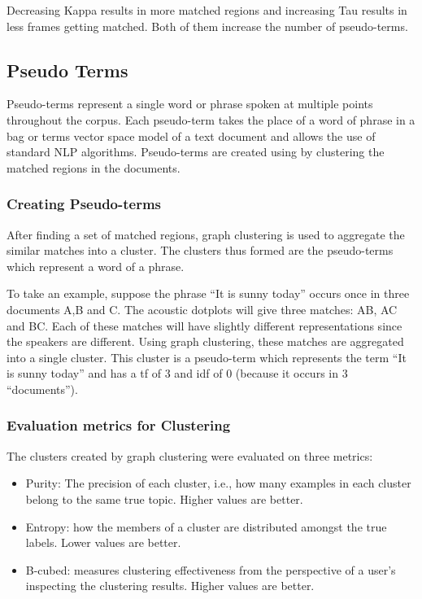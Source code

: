 \documentclass[a4paper]{article}
\begin{document}
Decreasing Kappa results in more matched regions and increasing Tau results in less frames getting matched. Both of them increase the number of pseudo-terms.

\subsection{Pseudo Terms}
Pseudo-terms represent a single word or phrase spoken at multiple points throughout the corpus. Each pseudo-term takes the place of a word of phrase in a bag or terms vector space model of a text document and allows the use of standard NLP algorithms. Pseudo-terms are created using by clustering the matched regions in the documents.

\subsubsection{Creating Pseudo-terms}
After finding a set of matched regions, graph clustering is used to aggregate the similar matches into a cluster.
The clusters thus formed are the pseudo-terms which represent a word of a phrase.

To take an example, suppose the phrase “It is sunny today” occurs once in three documents A,B and C. The acoustic dotplots will give three matches: AB, AC and BC. Each of these matches will have slightly different representations since the speakers are different. Using graph clustering, these matches are aggregated into a single cluster. This cluster is a pseudo-term which represents the term “It is sunny today” and has a tf of 3 and idf of 0 (because it occurs in 3 “documents”).

\subsubsection{Evaluation metrics for Clustering}
The clusters created by graph clustering were evaluated on three metrics:

\begin{itemize}
\item Purity: The precision of each cluster, i.e., how many examples in each cluster belong to the same true topic.
Higher values are better.
\item Entropy: how the members of a cluster are distributed amongst the true labels.
Lower values are better.
\item B-cubed: measures clustering effectiveness from the perspective of a user’s inspecting the clustering results.
Higher values are better.
\end{itemize}
\end{document}

